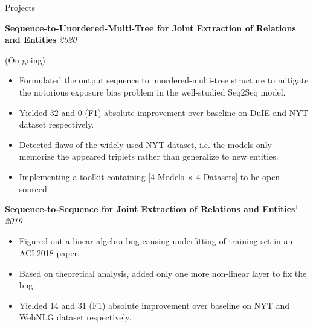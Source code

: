 \documentclass{resume} %
\begin{document}
\begin{rSection}{Projects}


{\bf Sequence-to-Unordered-Multi-Tree for Joint Extraction of Relations and Entities} \hfill {\em 2020}

(On going)
\begin{itemize}
    \item Formulated the output sequence to unordered-multi-tree structure to mitigate the notorious exposure bias problem in the well-studied Seq2Seq model.
    \item Yielded 32 and 0 (F1) absolute improvement over baseline on DuIE and NYT dataset respectively.
    \item Detected flaws of the widely-used NYT dataset, i.e. the models only memorize the appeared triplets rather than generalize to new entities.
    \item Implementing a toolkit containing [4 Models $\times$ 4 Datasets] to be open-sourced.  
\end{itemize}



{\bf Sequence-to-Sequence for Joint Extraction of Relations and Entities$^1$} \hfill {\em 2019}
\begin{itemize}
    \item Figured out a linear algebra bug causing underfitting of training set in an ACL2018 paper.
    \item Based on theoretical analysis, added only one more non-linear layer to fix the bug.
    \item  Yielded 14 and 31 (F1) absolute improvement over baseline on NYT and WebNLG dataset respectively.
\end{itemize}



\end{rSection}
\end{document}
